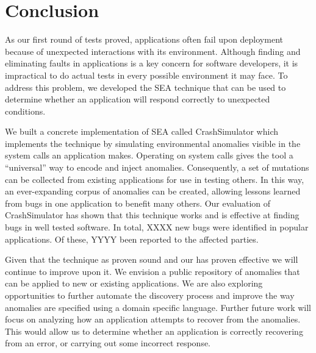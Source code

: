 \section{Conclusion}
\label{SEC:conclusion}

As our first round of tests proved,
applications often fail upon deployment because of unexpected interactions
with its environment.
Although finding and eliminating
faults in applications is a key concern for software developers, it is
impractical to do actual tests in every possible
environment it may face.
To address this problem, we developed the SEA
technique that can be used to determine whether an application will
respond correctly to unexpected conditions.

We built a concrete implementation of SEA
called CrashSimulator which implements
the technique by simulating environmental
anomalies visible in the system calls an application makes.
Operating on system calls gives the tool a ``universal'' way to
encode and inject anomalies. Consequently, a set of mutations can be
collected from existing applications for use in testing others.
In this way, an ever-expanding corpus of anomalies can be
created, allowing lessons learned from bugs in one application to benefit
many others.
Our evaluation of CrashSimulator
has shown that this technique works and is
effective at finding bugs in well tested software.
In total,
XXXX new bugs were identified in popular applications.
Of these, YYYY been reported to the
affected parties.

Given that the technique as proven sound
and our has proven effective we will continue to improve upon it.
We envision a public repository of anomalies
that can be applied to new or existing applications.
We are also exploring
opportunities to further automate the discovery process
and improve the way anomalies are specified using a
domain specific language.
Further future work
will focus on analyzing how an
application attempts
to recover from the anomalies.  This would allow
us to determine whether
an application is correctly recovering
from an error, or carrying out some incorrect response.
